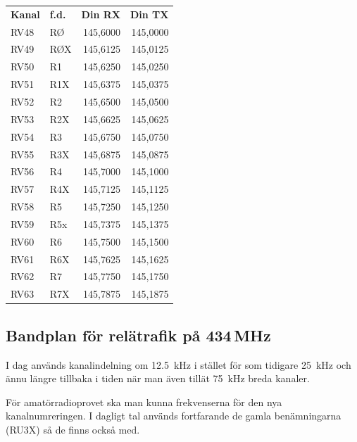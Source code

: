 \begin{tabular}{llrr}
	\textbf{Kanal} & \textbf{f.d.} & \textbf{Din RX} & \textbf{Din TX} \\
	RV48           & RØ            &        145,6000 &        145,0000 \\
	RV49           & RØX           &        145,6125 &        145,0125 \\
	RV50           & R1            &        145,6250 &        145,0250 \\
	RV51           & R1X           &        145,6375 &        145,0375 \\
	RV52           & R2            &        145,6500 &        145,0500 \\
	RV53           & R2X           &        145,6625 &        145,0625 \\
	RV54           & R3            &        145,6750 &        145,0750 \\
	RV55           & R3X           &        145,6875 &        145,0875 \\
	RV56           & R4            &        145,7000 &        145,1000 \\
	RV57           & R4X           &        145,7125 &        145,1125 \\
	RV58           & R5            &        145,7250 &        145,1250 \\
	RV59           & R5x           &        145,7375 &        145,1375 \\
	RV60           & R6            &        145,7500 &        145,1500 \\
	RV61           & R6X           &        145,7625 &        145,1625 \\
	RV62           & R7            &        145,7750 &        145,1750 \\
	RV63           & R7X           &        145,7875 &        145,1875
\end{tabular}





\subsection{Bandplan för relätrafik på 434\,MHz}

I dag används kanalindelning om \SI{12,5}{kHz} i stället för som tidigare \SI{25}{kHz} och ännu längre tillbaka i tiden när man även tillät \SI{75}{kHz} breda kanaler.

För amatörradioprovet ska man kunna frekvenserna för den nya kanalnumreringen. I dagligt tal används fortfarande de gamla benämningarna (RU3X) så de finns också med.



